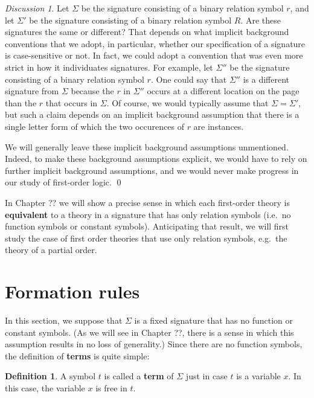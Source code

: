 \documentclass[11pt,fleqn]{article}
\theoremstyle{definition}
\newtheorem*{defn}{Definition}
\theoremstyle{remark}
\newtheorem*{disc}{Discussion}
\newcommand{\2}{\mathscr}
\begin{document}
\begin{disc} Let $\Sigma$ be the signature consisting of a binary
  relation symbol $r$, and let $\Sigma '$ be the signature consisting
  of a binary relation symbol $R$.  Are these signatures the same or
  different?  That depends on what implicit background conventions
  that we adopt, in particular, whether our specification of a
  signature is case-sensitive or not.  In fact, we could adopt a
  convention that was even more strict in how it individuates
  signatures.  For example, let $\Sigma ''$ be the signature
  consisting of a binary relation symbol $r$.  One could say that
  $\Sigma ''$ is a different signature from $\Sigma$ because the $r$
  in $\Sigma ''$ occurs at a different location on the page than the
  $r$ that occurs in $\Sigma$.  Of course, we would typically assume
  that $\Sigma =\Sigma '$, but such a claim depends on an implicit
  background assumption that there is a single letter form of which
  the two occurences of $r$ are instances.

  We will generally leave these implicit background assumptions
  unmentioned.  Indeed, to make these background assumptions explicit,
  we would have to rely on further implicit background assumptions,
  and we would never make progress in our study of first-order
  logic. \hfill \qed
\end{disc}

In Chapter ?? we will show a precise sense in which each first-order
theory is \textbf{equivalent} to a theory in a signature that has only
relation symbols (i.e.\ no function symbols or constant symbols).
Anticipating that result, we will first study the case of first order
theories that use only relation symbols, e.g.\ the theory of a partial
order.

\section*{Formation rules}

In this section, we suppose that $\Sigma$ is a fixed signature that
has no function or constant symbols.  (As we will see in Chapter ??,
there is a sense in which this assumption results in no loss of
generality.)  Since there are no function symbols, the definition of
\textbf{terms} is quite simple:

\begin{defn} A symbol $t$ is called a \textbf{term} of $\Sigma$ just
  in case $t$ is a variable $x$.  In this case, the variable $x$ is
  free in $t$.  \end{defn}
\end{document}
